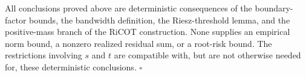 All conclusions proved above are deterministic consequences of the boundary-factor bounds, the bandwidth definition, the Riesz-threshold lemma, and the positive-mass branch of the RiCOT construction.  None supplies an empirical norm bound, a nonzero realized residual sum, or a root-risk bound.  The restrictions involving \(s\) and \(t\) are compatible with, but are not otherwise needed for, these deterministic conclusions. \(\square\)